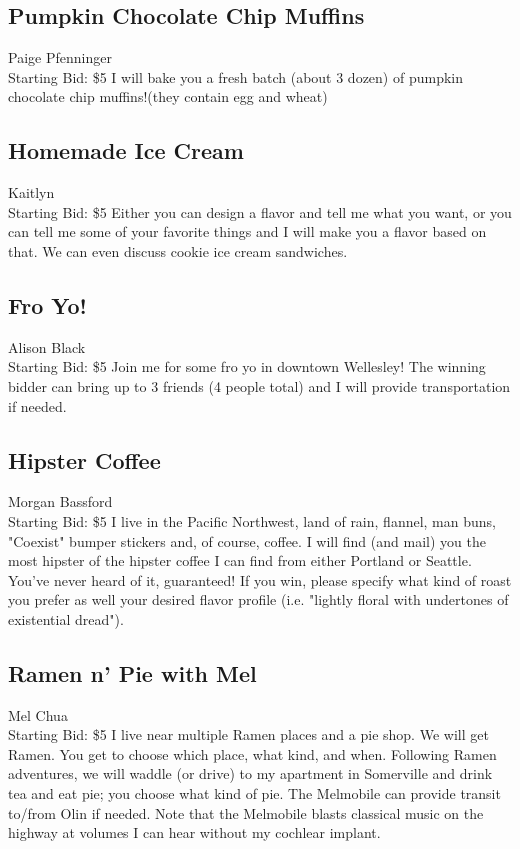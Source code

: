 \documentclass[11pt]{article}
\begin{document}
\subsection{Pumpkin Chocolate Chip Muffins }
Paige Pfenninger
\\
Starting Bid: \$5
\newline
I will bake you a fresh batch (about 3 dozen) of pumpkin chocolate chip muffins!(they contain egg and wheat)
\subsection{Homemade Ice Cream}
Kaitlyn
\\
Starting Bid: \$5
\newline
Either you can design a flavor and tell me what you want, or you can tell me some of your favorite things and I will make you a flavor based on that. We can even discuss cookie ice cream sandwiches.
\subsection{Fro Yo!}
Alison Black
\\
Starting Bid: \$5
\newline
Join me for some fro yo in downtown Wellesley!  The winning bidder can bring up to 3 friends (4 people total) and I will provide transportation if needed.
\subsection{Hipster Coffee}
Morgan Bassford
\\
Starting Bid: \$5
\newline
I live in the Pacific Northwest, land of rain, flannel, man buns, "Coexist" bumper stickers and, of course, coffee. I will find (and mail) you the most hipster of the hipster coffee I can find from either Portland or Seattle. You've never heard of it, guaranteed! If you win, please specify what kind of roast you prefer as well your desired flavor profile (i.e. "lightly floral with undertones of existential dread").
\subsection{Ramen n' Pie with Mel}
Mel Chua
\\
Starting Bid: \$5
\newline
I live near multiple Ramen places and a pie shop. We will get Ramen. You get to choose which place, what kind, and when. Following Ramen adventures, we will waddle (or drive) to my apartment in Somerville and drink tea and eat pie; you choose what kind of pie. The Melmobile can provide transit to/from Olin if needed. Note that the Melmobile blasts classical music on the highway at volumes I can hear without my cochlear implant.
\end{document}
